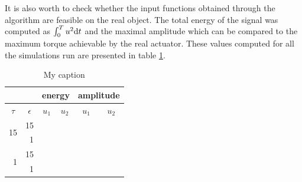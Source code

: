 It is also worth to check whether the input functions obtained through the algorithm are feasible on the real object. The total energy of the signal was computed as $\int_0^T u^2\mathrm{d} t$ and the maximal amplitude which can be compared to the maximum torque achievable by the real actuator. These values computed for all the simulations run are presented in table \ref{tab:control}.
\begin{table}[h]
\centering
\caption{My caption}
\label{tab:control} %
\begin{tabular}{rr|r|r|r|r|}
\cline{3-6}
\multicolumn{1}{c}{}                      & \multicolumn{1}{c|}{}           & \multicolumn{2}{c|}{energy}                             & \multicolumn{2}{c|}{amplitude}                          \\ \hline
\multicolumn{1}{|c|}{$\tau$}              & \multicolumn{1}{c|}{$\epsilon$} & \multicolumn{1}{c|}{$u_1$} & \multicolumn{1}{c|}{$u_2$} & \multicolumn{1}{c|}{$u_1$} & \multicolumn{1}{c|}{$u_2$} \\ \hline
\multicolumn{1}{|r|}{\multirow{2}{*}{15}} & 15                              &                            &                            &                            &                            \\ \cline{2-6} 
\multicolumn{1}{|r|}{}                    & 1                               &                            &                            &                            &                            \\ \hline
\multicolumn{1}{|r|}{\multirow{2}{*}{1}}  & 15                              &                            &                            &                            &                            \\ \cline{2-6} 
\multicolumn{1}{|r|}{}                    & 1                               &                            &                            &                            &                            \\ \hline
\end{tabular}
\end{table}
%

